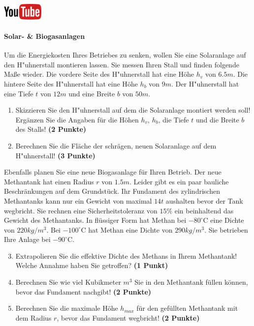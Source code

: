 \documentclass[a4paper, 9pt]{scrartcl}\usepackage[]{graphicx}\usepackage[]{xcolor}
\begin{document}
\hfill\href{https://youtu.be/aBxLkdF-c4M}{\includegraphics[width =
  2cm]{img/youtube}} %
\hspace{2Ex}

\paragraph{Solar- \& Biogasanlagen}



Um die Energiekosten Ihres Betriebes zu senken, wollen Sie eine Solaranlage
auf den H{"u}hnerstall montieren lassen. Sie messen Ihren Stall und finden
folgende Ma{\ss}e wieder. Die vordere Seite des H{"u}hnerstall hat eine H{\"o}he
$h_v$ von $6.5m$. Die hintere Seite des H{"u}hnerstall hat eine
H{\"o}he $h_b$ von $9m$. Der H{"u}hnerstall hat eine Tiefe $t$ von
$12m$ und eine Breite $b$ von $50m$.

\begin{enumerate}
\item Skizzieren Sie den H{"u}hnerstall auf dem die Solaranlage montiert
  werden soll! Erg{\"a}nzen Sie die Angaben f{\"u}r die H{\"o}hen $h_v$, $h_b$, die
  Tiefe $t$ und die Breite $b$ des Stalls!  \textbf{(2 Punkte)}
\item Berechnen Sie die Fl{\"a}che der schr{\"a}gen, neuen Solaranlage auf dem
  H{"u}hnerstall! \textbf{(3 Punkte)}
\end{enumerate}

Ebenfalls planen Sie eine neue Biogasanlage f{\"u}r Ihren Betrieb. Der neue
Methantank hat einen Radius $r$ von $1.5m$. Leider gibt es ein
paar bauliche Beschr{\"a}nkungen auf dem Grundst{\"u}ck. Ihr Fundament des
zylindrischen Methantanks kann nur ein Gewicht von maximal
$14t$ aushalten bevor der Tank wegbricht. Sie rechnen eine
Sicherheitstoleranz von $15\%$ ein beinhaltend das Gewicht des
Methantanks. In fl{\"u}ssiger Form hat
Methan bei $-80^\circ\text{C}$ eine Dichte von
$220kg/m^3$. Bei $-100^\circ\text{C}$ hat Methan eine Dichte
von $290kg/m^3$. Sie betrieben Ihre Anlage bei
$-90^\circ\text{C}$.

\begin{enumerate}
  \setcounter{enumi}{2}
\item Extrapolieren Sie die effektive Dichte des Methans in Ihrem
  Methantank! Welche Annahme haben Sie getroffen? \textbf{(1 Punkt)}
\item Berechnen Sie wie viel Kubikmeter $m^3$ Sie in den Methantank f{\"u}llen
  k{\"o}nnen, bevor das Fundament nachgibt! \textbf{(2 Punkte)}
\item Berechnen Sie die maximale H{\"o}he $h_{max}$ f{\"u}r den gef{\"u}llten
  Methantank mit dem Radius $r$, bevor das Fundament wegbricht! \textbf{(2
    Punkte)}
\end{enumerate}
\end{document}

